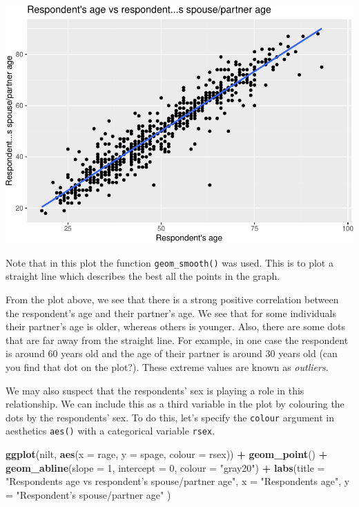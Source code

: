 \documentclass[
]{book}
\newenvironment{Shaded}{\begin{snugshade}}{\end{snugshade}}
\newcommand{\AttributeTok}[1]{\textcolor[rgb]{0.13,0.29,0.53}{#1}}
\newcommand{\DecValTok}[1]{\textcolor[rgb]{0.00,0.00,0.81}{#1}}
\newcommand{\FunctionTok}[1]{\textcolor[rgb]{0.13,0.29,0.53}{\textbf{#1}}}
\newcommand{\NormalTok}[1]{#1}
\newcommand{\SpecialCharTok}[1]{\textcolor[rgb]{0.81,0.36,0.00}{\textbf{#1}}}
\newcommand{\StringTok}[1]{\textcolor[rgb]{0.31,0.60,0.02}{#1}}
\begin{document}
\begin{flushleft}\includegraphics[width=1\linewidth]{lab-workbook_files/figure-latex/unnamed-chunk-77-1} \end{flushleft}

Note that in this plot the function \texttt{geom\_smooth()} was used. This is to plot a straight line which describes the best all the points in the graph.

From the plot above, we see that there is a strong positive correlation between the respondent's age and their partner's age. We see that for some individuals their partner's age is older, whereas others is younger. Also, there are some dots that are far away from the straight line. For example, in one case the respondent is around 60 years old and the age of their partner is around 30 years old (can you find that dot on the plot?). These extreme values are known as \emph{outliers}.

We may also suspect that the respondents' sex is playing a role in this relationship. We can include this as a third variable in the plot by colouring the dots by the respondents' sex. To do this, let's specify the \texttt{colour} argument in aesthetics \texttt{aes()} with a categorical variable \texttt{rsex}.

\begin{Shaded}
\begin{Highlighting}[]
\FunctionTok{ggplot}\NormalTok{(nilt, }\FunctionTok{aes}\NormalTok{(}\AttributeTok{x =}\NormalTok{ rage, }\AttributeTok{y =}\NormalTok{ spage, }\AttributeTok{colour =}\NormalTok{ rsex)) }\SpecialCharTok{+} 
  \FunctionTok{geom\_point}\NormalTok{() }\SpecialCharTok{+}
  \FunctionTok{geom\_abline}\NormalTok{(}\AttributeTok{slope =} \DecValTok{1}\NormalTok{, }\AttributeTok{intercept =} \DecValTok{0}\NormalTok{, }\AttributeTok{colour =} \StringTok{"gray20"}\NormalTok{) }\SpecialCharTok{+}
  \FunctionTok{labs}\NormalTok{(}\AttributeTok{title =} \StringTok{"Respondent\textquotesingle{}s age vs respondent’s spouse/partner age"}\NormalTok{, }
       \AttributeTok{x =} \StringTok{"Respondent\textquotesingle{}s age"}\NormalTok{, }\AttributeTok{y =} \StringTok{"Respondent’s spouse/partner age"}\NormalTok{ )}
\end{Highlighting}
\end{Shaded}
\end{document}

